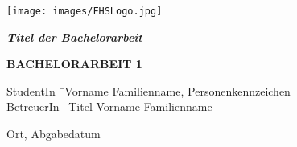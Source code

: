 \begin{titlepage}
\begin{center}

\texttt{[image: images/FHSLogo.jpg]}

\vspace*{4cm}

\Large{
	\textit{\textbf{Titel der Bachelorarbeit}}
}

\vspace*{4cm}

\large{
	\textbf{BACHELORARBEIT 1}
}

\end{center}

\vfill

\begin{tabbing}
StudentIn \= \ Vorname Familienname, Personenkennzeichen \\
BetreuerIn \> \ Titel Vorname Familienname
\end{tabbing}

Ort, Abgabedatum

\end{titlepage}

